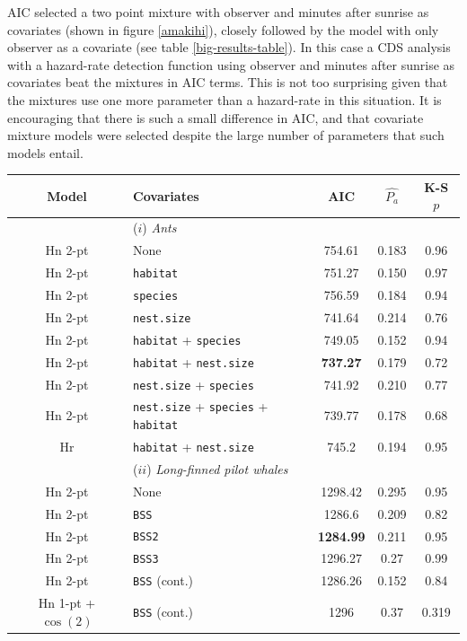 AIC selected a two point mixture with observer and minutes after sunrise as covariates (shown in figure \ref{amakihi}), closely followed by the model with only observer as a covariate (see table \ref{big-results-table}). In this case a CDS analysis with a hazard-rate detection function using observer and minutes after sunrise as covariates beat the mixtures in AIC terms. This is not too surprising given that the mixtures use one more parameter than a hazard-rate in this situation. It is encouraging that there is such a small difference in AIC, and that covariate mixture models were selected despite the large number of parameters that such models entail.


\begin{table}
\centering
\begin{tabular}{c l c c c}
Model & Covariates & AIC & $\hat{P_a}$ & K-S $p$\\
\hline
 & ($i$) \textit{Ants} & & &  \\
Hn 2-pt & None & 754.61 & 0.183 & 0.96 \\
Hn 2-pt & \texttt{habitat} & 751.27 & 0.150 & 0.97 \\ 
Hn 2-pt & \texttt{species} & 756.59 & 0.184 & 0.94 \\  
Hn 2-pt & \texttt{nest.size} & 741.64 & 0.214 & 0.76 \\   
Hn 2-pt & \texttt{habitat} + \texttt{species} & 749.05 & 0.152 & 0.94\\ 
Hn 2-pt & \texttt{habitat} + \texttt{nest.size} & \textbf{737.27} & 0.179 & 0.72\\
Hn 2-pt & \texttt{nest.size} + \texttt{species} & 741.92 & 0.210 & 0.77\\
Hn 2-pt & \texttt{nest.size} + \texttt{species} + \texttt{habitat} & 739.77 & 0.178 & 0.68 \\
Hr & \texttt{habitat} + \texttt{nest.size} & 745.2 & 0.194 & 0.95\\
 & ($ii$) \textit{Long-finned pilot whales} & & & \\
Hn 2-pt & None & 1298.42 & 0.295 & 0.95 \\
Hn 2-pt & \texttt{BSS} & 1286.6 & 0.209 & 0.82 \\
Hn 2-pt & \texttt{BSS2} & \textbf{1284.99} & 0.211 &  0.95\\
Hn 2-pt & \texttt{BSS3} & 1296.27 & 0.27 & 0.99 \\
Hn 2-pt & \texttt{BSS} (cont.) &  1286.26 & 0.152 & 0.84\\
Hn 1-pt + $\cos(2)$& \texttt{BSS} (cont.) & 1296 & 0.37 & 0.319 \\

\end{tabular}
\end{table}
